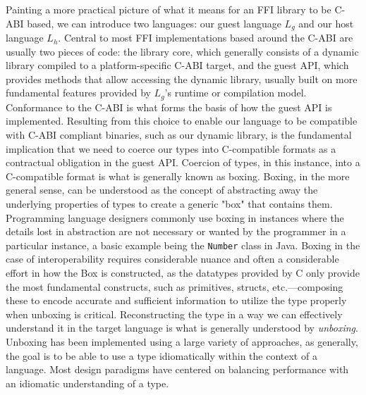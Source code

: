 Painting a more practical picture of what it means for an FFI library to be C-ABI based, we can introduce two languages: our guest language $L_g$ and our host language $L_h$. Central to most FFI implementations based around the C-ABI are usually two pieces of code: the library core, which generally consists of a dynamic library compiled to a platform-specific C-ABI target, and the guest API, which provides methods that allow accessing the dynamic library, usually built on more fundamental features provided by $L_g$'s runtime or compilation model. Conformance to the C-ABI is what forms the basis of how the guest API is implemented. Resulting from this choice to enable our language to be compatible with C-ABI compliant binaries, such as our dynamic library, is the fundamental implication that we need to coerce our types into C-compatible formats as a contractual obligation in the guest API. Coercion of types, in this instance, into a C-compatible format is what is generally known as boxing. Boxing, in the more general sense, can be understood as the concept of abstracting away the underlying properties of types to create a generic "box" that contains them. Programming language designers commonly use boxing in instances where the details lost in abstraction are not necessary or wanted by the programmer in a particular instance, a basic example being the \texttt{Number} class in Java. Boxing in the case of interoperability requires considerable nuance and often a considerable effort in how the Box is constructed, as the datatypes provided by C only provide the most fundamental constructs, such as primitives, structs, etc.—composing these to encode accurate and sufficient information to utilize the type properly when unboxing is critical. Reconstructing the type in a way we can effectively understand it in the target language is what is generally understood by \textit{unboxing}. Unboxing has been implemented using a large variety of approaches, as generally, the goal is to be able to use a type idiomatically within the context of a language. Most design paradigms have centered on balancing performance with an idiomatic understanding of a type.

